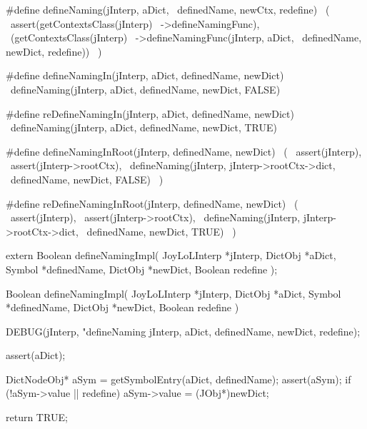 #define defineNaming(jInterp, aDict,      \
  definedName, newCtx, redefine)          \
  (                                       \
    assert(getContextsClass(jInterp)      \
      ->defineNamingFunc),                \
    (getContextsClass(jInterp)            \
      ->defineNamingFunc(jInterp, aDict,  \
        definedName, newDict, redefine))  \
  )

#define defineNamingIn(jInterp, aDict, definedName, newDict)  \
  defineNaming(jInterp, aDict, definedName, newDict, FALSE)

#define reDefineNamingIn(jInterp, aDict, definedName, newDict)  \
  defineNaming(jInterp, aDict, definedName, newDict, TRUE)

#define defineNamingInRoot(jInterp, definedName, newDict) \
  (                                                       \
    assert(jInterp),                                      \
    assert(jInterp->rootCtx),                             \
    defineNaming(jInterp, jInterp->rootCtx->dict,         \
      definedName, newDict, FALSE)                        \
  )

#define reDefineNamingInRoot(jInterp, definedName, newDict) \
  (                                                         \
    assert(jInterp),                                        \
    assert(jInterp->rootCtx),                               \
    defineNaming(jInterp, jInterp->rootCtx->dict,           \
      definedName, newDict, TRUE)                           \
  )
\stopCHeader

\setCHeaderStream{private}
\startCHeader
extern Boolean defineNamingImpl(
  JoyLoLInterp *jInterp,
  DictObj      *aDict,
  Symbol       *definedName,
  DictObj      *newDict,
  Boolean       redefine
);
\stopCHeader
\setCHeaderStream{public}

\startCCode
Boolean defineNamingImpl(
  JoyLoLInterp *jInterp,
  DictObj      *aDict,
  Symbol       *definedName,
  DictObj      *newDict,
  Boolean       redefine
) {
  DEBUG(jInterp, "defineNaming %
        jInterp, aDict, definedName, newDict, redefine);

  assert(aDict);
  
  DictNodeObj* aSym = getSymbolEntry(aDict, definedName);
  assert(aSym);
  if (!aSym->value || redefine) {
    aSym->value   = (JObj*)newDict;
  }

  return TRUE;
}
\stopCCode
